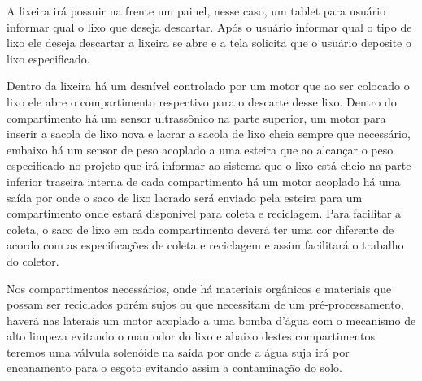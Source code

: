 A lixeira irá possuir na frente um painel, nesse caso, um tablet para usuário informar qual o lixo que deseja descartar. Após o usuário informar qual o tipo de lixo ele deseja descartar a lixeira se abre e a tela solicita que o usuário deposite o lixo especificado.

Dentro da lixeira há um desnível controlado por um motor que ao ser colocado o lixo ele abre o compartimento respectivo para o descarte desse lixo. Dentro do compartimento há um sensor ultrassônico na parte superior, um motor para inserir a sacola de lixo nova e lacrar a sacola de lixo cheia sempre que necessário, embaixo há um sensor de peso acoplado a uma esteira que ao alcançar o peso especificado no projeto que irá informar ao sistema que o lixo está cheio na parte inferior traseira interna de cada compartimento há um motor acoplado há uma saída por onde o saco de lixo lacrado será enviado pela esteira para um compartimento onde estará disponível para coleta e reciclagem. Para facilitar a coleta, o saco de lixo em cada compartimento deverá ter uma cor diferente de acordo com as especificações de coleta e reciclagem e assim facilitará o trabalho do coletor.

Nos compartimentos necessários, onde há materiais orgânicos e materiais que possam ser reciclados porém sujos ou que necessitam de um pré-processamento, haverá nas laterais um motor acoplado a uma bomba d'água com o mecanismo de alto limpeza evitando o mau odor do lixo e abaixo destes compartimentos teremos uma válvula solenóide na saída por onde a água suja irá por encanamento para o esgoto evitando assim a contaminação do solo.







